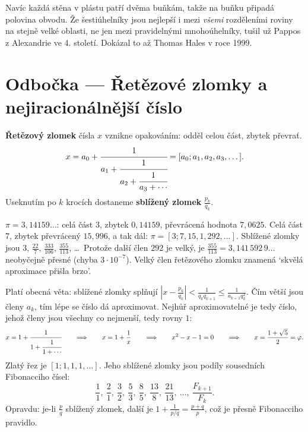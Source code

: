 Navíc každá stěna v plástu patří dvěma buňkám, takže na buňku připadá polovina obvodu. Že šestiúhelníky jsou nejlepší i mezi \textit{všemi} rozděleními roviny na stejně velké oblasti, ne jen mezi pravidelnými mnohoúhelníky, tušil už Pappos z Alexandrie ve 4. století. Dokázal to až Thomas Hales v roce 1999.

\section{Odbočka --- Řetězové zlomky a nejiracionálnější číslo}

\begin{definitionbox}
  \textbf{Řetězový zlomek} čísla $x$ vznikne opakováním: odděl celou část, zbytek převrať.
  \begin{equation*}
    x = a_0 + \cfrac{1}{a_1 + \cfrac{1}{a_2 + \cfrac{1}{a_3 + \cdots}}} = [a_0; a_1, a_2, a_3, \dots].
  \end{equation*}
  Useknutím po $k$ krocích dostaneme \textbf{sblížený zlomek} $\frac{p_k}{q_k}$.
\end{definitionbox}

\begin{example}
  $\pi = 3{,}14159\ldots$: celá část $3$, zbytek $0{,}14159$, převrácená hodnota $7{,}0625$. Celá část $7$, zbytek převrácený $15{,}996$, a tak dál: $\pi = [3; 7, 15, 1, 292, \dots]$. Sblížené zlomky jsou $3$, $\frac{22}{7}$, $\frac{333}{106}$, $\frac{355}{113}$, \dots\ Protože další člen $292$ je velký, je $\frac{355}{113} = 3{,}141\,592\,9\ldots$ neobyčejně přesné (chyba $3\cdot 10^{-7}$). Velký člen řetězového zlomku znamená `skvělá aproximace přišla brzo'.
\end{example}

Platí obecná věta: sblížené zlomky splňují $\left|x - \frac{p_k}{q_k}\right| < \frac{1}{q_kq_{k+1}}\leq\frac{1}{a_{k+1}q_k^2}$. Čím větší jsou členy $a_k$, tím lépe se číslo dá aproximovat. Nejhůř aproximovatelné je tedy číslo, jehož členy jsou všechny co nejmenší, tedy rovny $1$:
\begin{equation*}
  x = 1 + \cfrac{1}{1 + \cfrac{1}{1 + \cdots}}\qquad\Longrightarrow\qquad x = 1 + \frac{1}{x}\qquad\Longrightarrow\qquad x^2 - x - 1 = 0\qquad\Longrightarrow\qquad x = \frac{1 + \sqrt{5}}{2} = \varphi.
\end{equation*}
Zlatý řez je $[1; 1, 1, 1, \dots]$. Jeho sblížené zlomky jsou podíly sousedních Fibonacciho čísel:
\begin{equation*}
  \frac{1}{1},\ \frac{2}{1},\ \frac{3}{2},\ \frac{5}{3},\ \frac{8}{5},\ \frac{13}{8},\ \frac{21}{13},\ \dots,\ \frac{F_{k+1}}{F_k}.
\end{equation*}
Opravdu: je-li $\frac{p}{q}$ sblížený zlomek, další je $1 + \frac{1}{p/q} = \frac{p + q}{p}$, což je přesně Fibonacciho pravidlo.

